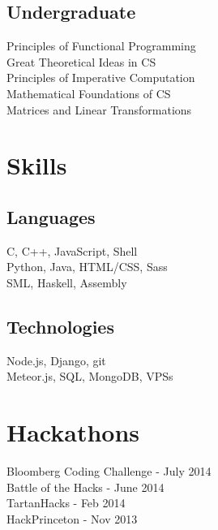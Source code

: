\documentclass[]{deedy-resume-openfont}
\begin{document}
\begin{minipage}[t]{0.33\textwidth}
\subsection{Undergraduate}
Principles of Functional Programming \\
Great Theoretical Ideas in CS \\
Principles of Imperative Computation \\
Mathematical Foundations of CS \\
Matrices and Linear Transformations \\
\sectionsep


\section{Skills}
\subsection{Languages}
C, C++, JavaScript, Shell \\
Python, Java, HTML/CSS, Sass \\
SML, Haskell, Assembly \\
\sectionsep

\subsection{Technologies}
Node.js, Django, git \\
Meteor.js, SQL, MongoDB, VPSs
\sectionsep


\section{Hackathons} 
Bloomberg Coding Challenge - July 2014 \\
Battle of the Hacks - June 2014 \\
TartanHacks - Feb 2014 \\
HackPrinceton - Nov 2013 \\
\sectionsep

%
%

\end{minipage} 
\end{document}
